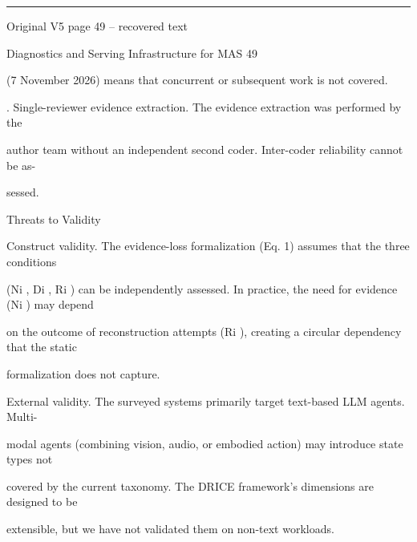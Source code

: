 \par\smallskip\noindent\rule{\textwidth}{0.4pt}\par{\sffamily\footnotesize Original V5 page 49 -- recovered text}\par\begin{flushleft}\footnotesize\ttfamily
\par\smallskip
\par\smallskip
\noindent Diagnostics and Serving Infrastructure for MAS 49\par
\par\smallskip
\par\smallskip
\par\smallskip
\noindent  (7 November 2026) means that concurrent or subsequent work is not covered.\par
{}. Single-reviewer evidence extraction. The evidence extraction was performed by the\par
\noindent  author team without an independent second coder. Inter-coder reliability cannot be as-\par
\noindent  sessed.\par
\par\smallskip
{} Threats to Validity\par
\noindent Construct validity. The evidence-loss formalization (Eq. 1) assumes that the three conditions\par
\noindent (Ni , Di , Ri ) can be independently assessed. In practice, the need for evidence (Ni ) may depend\par
\noindent on the outcome of reconstruction attempts (Ri ), creating a circular dependency that the static\par
\noindent formalization does not capture.\par
\par\smallskip
\noindent External validity. The surveyed systems primarily target text-based LLM agents. Multi-\par
\noindent modal agents (combining vision, audio, or embodied action) may introduce state types not\par
\noindent covered by the current taxonomy. The DRICE framework’s dimensions are designed to be\par
\noindent extensible, but we have not validated them on non-text workloads.\par
\par\smallskip
\par\smallskip

\end{flushleft}
